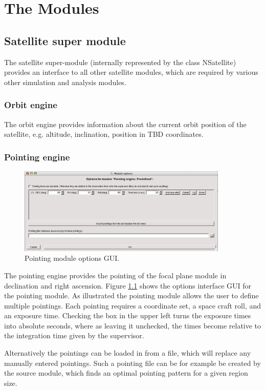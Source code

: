 \chapter{The Modules}

\section{Satellite super module}
The satellite super-module (internally represented by the class NSatellite) provides an interface to all other satellite modules, which are required by various other simulation and analysis modules.
\subsection{Orbit engine}
The orbit engine provides information about the current orbit position of the satellite, e.g. altitude, inclination, position in TBD coordinates.

\subsection{Pointing engine}
\begin{figure}[tb]
\begin{center}
\includegraphics[width=10cm]{images/pointingGUI.png}  
\caption{Pointing module options GUI.}
\label{pointinggui} 
\end{center}
\end{figure}
The pointing engine provides the pointing of the focal plane module in declination and right ascension. Figure \ref{pointinggui} shows the options interface GUI for the pointing module. As illustrated the pointing module allows the user to define multiple pointings. Each pointing requires a coordinate set, a space craft roll, and an exposure time. Checking the box in the upper left turns the exposure times into absolute seconds, where as leaving it unchecked, the times become relative to the integration time given by the supervisor.

Alternatively the pointings can be loaded in from a file, which will replace any manually entered pointings. Such a pointing file can be for example be created by the source module, which finds an optimal pointing pattern for a given region size.

